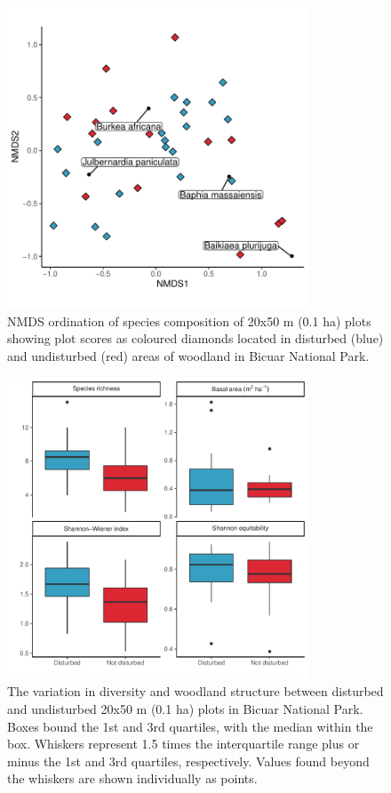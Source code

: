 \begin{refsection}
\begin{figure}
	\includegraphics[width=0.8\textwidth]{img/bicuar_degrad_nmds}
	\caption[NMDS ordination of undisturbed and disturbed plots in Bicuar National Park]{NMDS ordination of species composition of 20x50 m (0.1 ha) plots showing plot scores as coloured diamonds located in disturbed (blue) and undisturbed (red) areas of woodland in Bicuar National Park.}
	\label{bicuar:bicuar_degrad_nmds}
\end{figure}

\begin{figure}
	\includegraphics[width=0.8\textwidth]{img/degrad_box}
	\caption[Variation in diversity and woodland structure among disturbed and undisturbed plots]{The variation in diversity and woodland structure between disturbed and undisturbed 20x50 m (0.1 ha) plots in Bicuar National Park. Boxes bound the 1st and 3rd quartiles, with the median within the box. Whiskers represent 1.5 times the interquartile range plus or minus the 1st and 3rd quartiles, respectively. Values found beyond the whiskers are shown individually as points.}
	\label{bicuar:degrad_box}
\end{figure}


\end{refsection}
